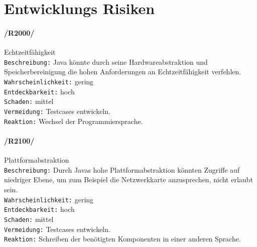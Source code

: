  \section{Entwicklungs Risiken}
 \label{sec:devrisk}

 \paragraph{/R2000/}Echtzeitfähigkeit\\
 \texttt{Beschreibung:} Java könnte durch seine Hardwareabstraktion und
 Speicherbereinigung die hohen Anforderungen an Echtzeitfähigkeit verfehlen. \\ \texttt{Wahrscheinlichkeit:} gering\\
 \texttt{Entdeckbarkeit:} hoch\\
 \texttt{Schaden:} mittel\\
 \texttt{Vermeidung:} Testcases entwickeln. \\
 \texttt{Reaktion:} Wechsel der Programmiersprache.\\

 \paragraph{/R2100/}Plattformabstraktion\\
 \texttt{Beschreibung:} Durch Javas hohe Plattformabstraktion könnten Zugriffe
 auf niedriger Ebene, um zum Beispiel die Netzwerkkarte anzusprechen, nicht
 erlaubt sein. \\ \texttt{Wahrscheinlichkeit:} gering\\ \texttt{Entdeckbarkeit:} hoch\\
 \texttt{Schaden:} mittel\\
 \texttt{Vermeidung:} Testcases entwickeln.\\
 \texttt{Reaktion:} Schreiben der benötigten Komponenten in einer anderen Sprache.\\


